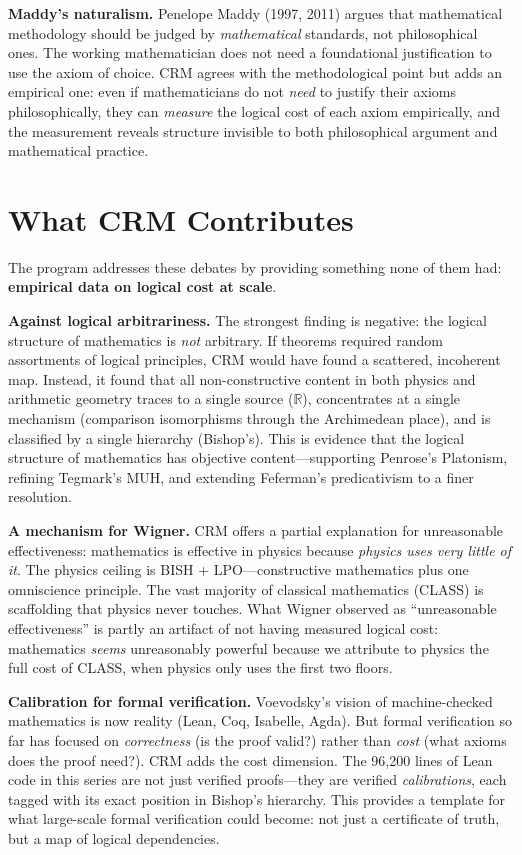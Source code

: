 \documentclass[11pt,twoside,openany]{report}
\theoremstyle{remark}
\newcommand{\BISH}{\textsf{BISH}}
\newcommand{\LPO}{\textsf{LPO}}
\newcommand{\CLASS}{\textsf{CLASS}}
\begin{document}
\textbf{Maddy's naturalism.}
Penelope Maddy (1997, 2011) argues that mathematical methodology should be judged by \emph{mathematical} standards, not philosophical ones. The working mathematician does not need a foundational justification to use the axiom of choice. CRM agrees with the methodological point but adds an empirical one: even if mathematicians do not \emph{need} to justify their axioms philosophically, they can \emph{measure} the logical cost of each axiom empirically, and the measurement reveals structure invisible to both philosophical argument and mathematical practice.

\section{What CRM Contributes}

The program addresses these debates by providing something none of them had: \textbf{empirical data on logical cost at scale}.

\textbf{Against logical arbitrariness.}
The strongest finding is negative: the logical structure of mathematics is \emph{not} arbitrary. If theorems required random assortments of logical principles, CRM would have found a scattered, incoherent map. Instead, it found that all non-constructive content in both physics and arithmetic geometry traces to a single source ($\mathbb{R}$), concentrates at a single mechanism (comparison isomorphisms through the Archimedean place), and is classified by a single hierarchy (Bishop's). This is evidence that the logical structure of mathematics has objective content---supporting Penrose's Platonism, refining Tegmark's MUH, and extending Feferman's predicativism to a finer resolution.

\textbf{A mechanism for Wigner.}
CRM offers a partial explanation for unreasonable effectiveness: mathematics is effective in physics because \emph{physics uses very little of it}. The physics ceiling is \BISH{} + \LPO---constructive mathematics plus one omniscience principle. The vast majority of classical mathematics (\CLASS) is scaffolding that physics never touches. What Wigner observed as ``unreasonable effectiveness'' is partly an artifact of not having measured logical cost: mathematics \emph{seems} unreasonably powerful because we attribute to physics the full cost of \CLASS, when physics only uses the first two floors.

\textbf{Calibration for formal verification.}
Voevodsky's vision of machine-checked mathematics is now reality (Lean, Coq, Isabelle, Agda). But formal verification so far has focused on \emph{correctness} (is the proof valid?) rather than \emph{cost} (what axioms does the proof need?). CRM adds the cost dimension. The 96,200 lines of Lean code in this series are not just verified proofs---they are verified \emph{calibrations}, each tagged with its exact position in Bishop's hierarchy. This provides a template for what large-scale formal verification could become: not just a certificate of truth, but a map of logical dependencies.
\end{document}
